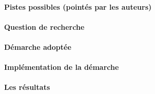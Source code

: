 \paragraph{Pistes possibles (pointés par les auteurs)}
\lipsum[1]

\paragraph{Question de recherche}
\lipsum[1]

\paragraph{Démarche adoptée}
\lipsum[1]

\paragraph{Implémentation de la démarche}
\lipsum[1]

\paragraph{Les résultats}
\lipsum[1]
